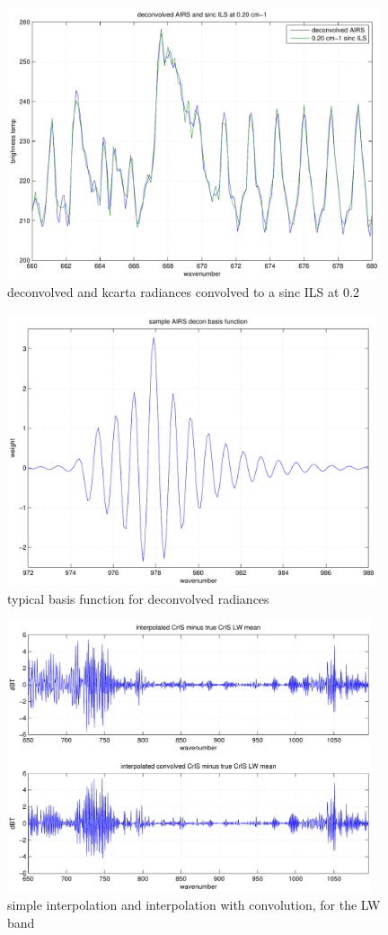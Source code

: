 \documentclass[12pt]{article}
\begin{document}
\begin{figure}
  \centering
  \includegraphics[height=8cm]{figures/airs_decon_res.pdf}
  \caption{deconvolved {\airs} and kcarta radiances convolved to a
    sinc ILS at 0.2 {\wn}}
  \label{dsinc}
\end{figure}

\begin{figure}
  \centering
  \includegraphics[height=8cm]{figures/airs_decon_basis.pdf}
  \caption{typical basis function for deconvolved {\airs} radiances}
  \label{dbasis}
\end{figure}

\begin{figure}
  \centering
  \includegraphics[height=8cm]{figures/airs_cris_intp_LW.pdf}
  \caption{simple interpolation and interpolation with convolution, 
    for the {\cris} LW band}
  \label{intpLW}
\end{figure}
\end{document}
